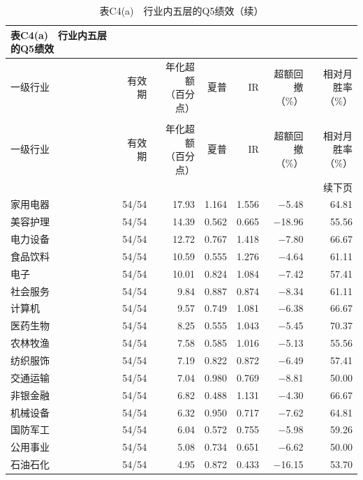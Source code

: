 \begingroup\small\setlength{\tabcolsep}{4pt}
\begin{longtable}{lrrrrrr}
\caption*{\textbf{表C4(a)　行业内五层的Q5绩效}}\\
\toprule
一级行业 & 有效期 & \makecell{年化超额\\（百分点）} & 夏普 & IR & \makecell{超额回撤\\（\%）} & \makecell{相对月\\胜率（\%）} \\ \midrule
\endfirsthead
\caption*{表C4(a)　行业内五层的Q5绩效（续）}\\\toprule
一级行业 & 有效期 & \makecell{年化超额\\（百分点）} & 夏普 & IR & \makecell{超额回撤\\（\%）} & \makecell{相对月\\胜率（\%）} \\ \midrule
\endhead
\midrule\multicolumn{7}{r}{续下页}\\\endfoot
\bottomrule\endlastfoot
家用电器 & 54/54 & 17.93 & 1.164 & 1.556 & $-$5.48 & 64.81 \\
美容护理 & 54/54 & 14.39 & 0.562 & 0.665 & $-$18.96 & 55.56 \\
电力设备 & 54/54 & 12.72 & 0.767 & 1.418 & $-$7.80 & 66.67 \\
食品饮料 & 54/54 & 10.59 & 0.555 & 1.276 & $-$4.64 & 61.11 \\
电子 & 54/54 & 10.01 & 0.824 & 1.084 & $-$7.42 & 57.41 \\
社会服务 & 54/54 & 9.84 & 0.887 & 0.874 & $-$8.34 & 61.11 \\
计算机 & 54/54 & 9.57 & 0.749 & 1.081 & $-$6.38 & 66.67 \\
医药生物 & 54/54 & 8.25 & 0.555 & 1.043 & $-$5.45 & 70.37 \\
农林牧渔 & 54/54 & 7.58 & 0.585 & 1.016 & $-$5.13 & 55.56 \\
纺织服饰 & 54/54 & 7.19 & 0.822 & 0.872 & $-$6.49 & 57.41 \\
交通运输 & 54/54 & 7.04 & 0.980 & 0.769 & $-$8.81 & 50.00 \\
非银金融 & 54/54 & 6.82 & 0.488 & 1.131 & $-$4.30 & 66.67 \\
机械设备 & 54/54 & 6.32 & 0.950 & 0.717 & $-$7.62 & 64.81 \\
国防军工 & 54/54 & 6.04 & 0.572 & 0.755 & $-$5.98 & 59.26 \\
公用事业 & 54/54 & 5.08 & 0.734 & 0.651 & $-$6.62 & 50.00 \\
石油石化 & 54/54 & 4.95 & 0.872 & 0.433 & $-$16.15 & 53.70 \\

\end{longtable}

